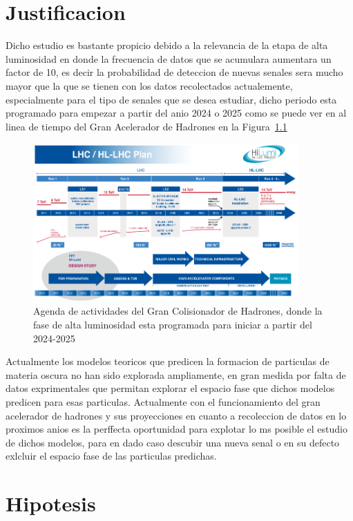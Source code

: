 \chapter{Justificacion}


Dicho estudio es bastante propicio debido a la relevancia de la etapa de alta luminosidad en donde la frecuencia de datos que se acumulara aumentara un factor de 10, es decir la probabilidad de deteccion de nuevas senales sera mucho mayor que la que se tienen con los datos recolectados actualemente, especialmente para el tipo de senales que se desea estudiar, dicho periodo esta programado para empezar a partir del anio 2024 o 2025 como se puede ver en al linea de tiempo del Gran Acelerador de Hadrones en la Figura~\ref{fig:lhctimeline}

\begin{figure}
\begin{center}
  \includegraphics[width=4.0in]{lhc_timeline.png}
  \caption{Agenda de actividades del Gran Colisionador de Hadrones, donde la fase de alta luminosidad esta programada para iniciar a partir del 2024-2025}
  \label{fig:lhctimeline}
\end{center}
\end{figure}



Actualmente los modelos teoricos que predicen la formacion de particulas de materia oscura no han sido explorada ampliamente, en gran medida por falta de datos exprimentales que permitan explorar el espacio fase que dichos modelos predicen para esas particulas.  Actualmente con el funcionamiento del gran acelerador de hadrones y sus proyecciones en cuanto a recoleccion de datos en lo proximos anios es la perffecta oportunidad para explotar lo ms posible el estudio de dichos modelos, para en dado caso descubir una nueva senal o en su defecto exlcluir el espacio fase de las particulas predichas. 

\chapter{Hipotesis}

